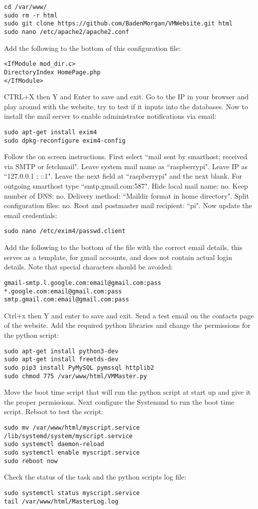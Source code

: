 \documentclass[a4paper,11pt]{article}
\numberwithin{figure}{section}
\numberwithin{table}{section}
\begin{document}
\begin{appendices}
\begin{lstlisting}[firstnumber=16]
cd /var/www/
sudo rm -r html
sudo git clone https://github.com/BadenMorgan/VMWebsite.git html
sudo nano /etc/apache2/apache2.conf
\end{lstlisting}
Add the following to the bottom of this configuration file:
\begin{lstlisting}[firstnumber=20]
<IfModule mod_dir.c>
DirectoryIndex HomePage.php
</IfModule>
\end{lstlisting}
CTRL+X then Y and Enter to save and exit. Go to the IP in your browser and play around with the website, try to test if it inputs into the databases. Now to install the mail server to enable administrator notifications via email:
\begin{lstlisting}[firstnumber=23]
sudo apt-get install exim4
sudo dpkg-reconfigure exim4-config
\end{lstlisting}
Follow the on screen instructions. First select ``mail sent by smarthost; received via SMTP or fetchmail". Leave system mail name as ``raspberrypi". Leave IP as ``127.0.0.1 ; ::1". Leave the next field at ``raspberrypi" and the next blank. For outgoing smarthost type ``smtp.gmail.com:587". Hide local mail name: no. Keep number of DNS: no. Delivery method: ``Maildir format in home directory". Split configuration files: no. Root and postmaster mail recipient: ``pi". Now update the email credentials:
\begin{lstlisting}[firstnumber=25]
sudo nano /etc/exim4/passwd.client
\end{lstlisting}
Add the following to the bottom of the file with the correct email details, this serves as a template, for gmail accounts, and does not contain actual login details. Note that special characters should be avoided:
\begin{lstlisting}[firstnumber=26]
gmail-smtp.l.google.com:email@gmail.com:pass
*.google.com:email@gmail.com:pass
smtp.gmail.com:email@gmail.com:pass
\end{lstlisting}
Ctrl+x then Y and enter to save and exit. Send a test email on the contacts page of the website. Add the required python libraries and change the permissions for the python script:
\begin{lstlisting}[firstnumber=29]
sudo apt-get install python3-dev
sudo apt-get install freetds-dev
sudo pip3 install PyMySQL pymssql httplib2
sudo chmod 775 /var/www/html/VMMaster.py
\end{lstlisting}
Move the boot time script that will run the python script at start up and give it the proper permissions. Next configure the Systemmd to run the boot time script. Reboot to test the script:
\begin{lstlisting}[firstnumber=33]
sudo mv /var/www/html/myscript.service /lib/systemd/system/myscript.service
sudo systemctl daemon-reload
sudo systemctl enable myscript.service
sudo reboot now
\end{lstlisting}
Check the status of the task and the python scripts log file:
\begin{lstlisting}[firstnumber=37]
sudo systemctl status myscript.service
tail /var/www/html/MasterLog.log
\end{lstlisting}


\end{appendices}
\end{document}
